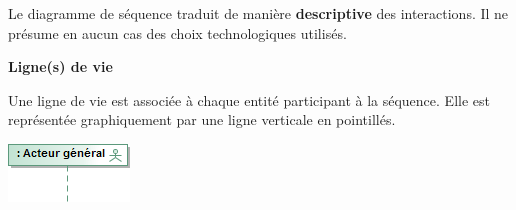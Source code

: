 \documentclass[10pt]{article}
\begin{document}
\begin{rem}
Le diagramme de séquence traduit de manière \textbf{descriptive} des interactions. Il ne présume en aucun cas des choix technologiques utilisés. 
\end{rem}

\begin{defi}
\begin{minipage}[c]{.8\linewidth}
\textbf{Ligne(s) de vie}

Une ligne de vie est associée à chaque entité participant à la séquence. Elle est représentée graphiquement par une ligne verticale en pointillés. 
\end{minipage} \hfill
\begin{minipage}[c]{.15 \linewidth}
\begin{center}
\includegraphics[width=.95\textwidth]{images/LigneVie}
\end{center}
\end{minipage}
\end{defi}
\end{document}
